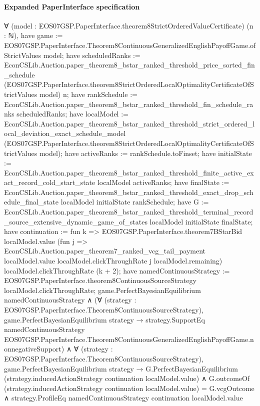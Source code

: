 \documentclass[10pt]{article}
\begin{document}
\paragraph{Expanded PaperInterface specification}
\begin{ReviewVerbatim}
∀ (model : EOS07GSP.PaperInterface.theorem8StrictOrderedValueCertificate) (n : ℕ),
  have game := EOS07GSP.PaperInterface.Theorem8ContinuousGeneralizedEnglishPayoffGame.ofStrictValues model;
  have scheduledRanks :=
    EconCSLib.Auction.paper_theorem8_bstar_ranked_threshold_price_sorted_fin_schedule
      (EOS07GSP.PaperInterface.theorem8StrictOrderedLocalOptimalityCertificateOfStrictValues model) n;
  have rankSchedule := EconCSLib.Auction.paper_theorem8_bstar_ranked_threshold_fin_schedule_ranks scheduledRanks;
  have localModel :=
    EconCSLib.Auction.paper_theorem8_bstar_ranked_threshold_strict_ordered_local_deviation_exact_schedule_model
      (EOS07GSP.PaperInterface.theorem8StrictOrderedLocalOptimalityCertificateOfStrictValues model);
  have activeRanks := rankSchedule.toFinset;
  have initialState :=
    EconCSLib.Auction.paper_theorem8_bstar_ranked_threshold_finite_active_exact_record_cold_start_state localModel
      activeRanks;
  have finalState :=
    EconCSLib.Auction.paper_theorem8_bstar_ranked_threshold_exact_drop_schedule_final_state localModel initialState
      rankSchedule;
  have G :=
    EconCSLib.Auction.paper_theorem8_bstar_ranked_threshold_terminal_record_source_extensive_dynamic_game_of_states
      localModel initialState finalState;
  have continuation := fun k =>
    EOS07GSP.PaperInterface.theorem7BStarBid localModel.value
      (fun j =>
        EconCSLib.Auction.paper_theorem7_ranked_vcg_tail_payment localModel.value localModel.clickThroughRate j
          localModel.remaining)
      localModel.clickThroughRate (k + 2);
  have namedContinuousStrategy := EOS07GSP.PaperInterface.theorem8ContinuousSourceStrategy localModel.clickThroughRate;
  game.PerfectBayesianEquilibrium namedContinuousStrategy ∧
    (∀ (strategy : EOS07GSP.PaperInterface.Theorem8ContinuousSourceStrategy),
        game.PerfectBayesianEquilibrium strategy →
          strategy.SupportEq namedContinuousStrategy
            EOS07GSP.PaperInterface.Theorem8ContinuousGeneralizedEnglishPayoffGame.nonnegativeSupport) ∧
      ∀ (strategy : EOS07GSP.PaperInterface.Theorem8ContinuousSourceStrategy),
        game.PerfectBayesianEquilibrium strategy →
          G.PerfectBayesianEquilibrium (strategy.inducedActionStrategy continuation localModel.value) ∧
            G.outcomeOf (strategy.inducedActionStrategy continuation localModel.value) = G.vcgOutcome ∧
              strategy.ProfileEq namedContinuousStrategy continuation localModel.value
\end{ReviewVerbatim}
\end{document}
